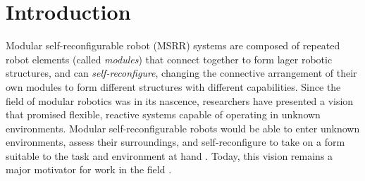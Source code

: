 \documentclass[12pt]{article}
\begin{document}
%

\section{Introduction}

Modular self-reconfigurable robot (MSRR) systems are composed of repeated robot elements (called \textit{modules}) that connect together to form lager robotic structures, and can \textit{self-reconfigure}, changing the connective arrangement of their own modules to form different structures with different capabilities.  Since the field of modular robotics was in its nascence, researchers have presented a vision that promised flexible, reactive systems capable of operating in unknown environments.  Modular self-reconfigurable robots would be able to enter unknown environments, assess their surroundings, and self-reconfigure to take on a form suitable to the task and environment at hand \cite{Yim1994}.  Today, this vision remains a major motivator for work in the field \cite{Yim2007a}.  
\end{document}
